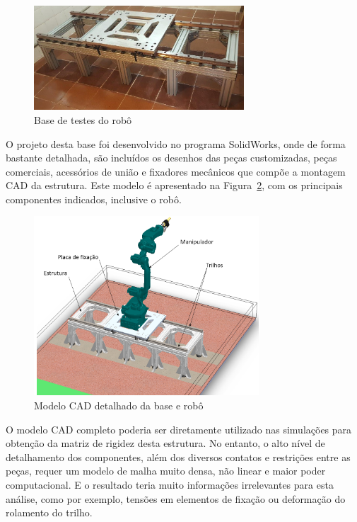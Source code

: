 \begin{figure}[h]
	\centering 
 	\includegraphics[width=0.70\textwidth]{figs/estrut_modelo_fisico}
 	\caption{Base de testes do robô}
 	\label{fig::estrut_modelo_fisico}
\end{figure}

O projeto desta base foi desenvolvido no programa SolidWorks, onde de forma
bastante detalhada, são incluídos os desenhos das peças customizadas, peças
comerciais, acessórios de união e fixadores mecânicos que compõe a montagem CAD
da estrutura. Este modelo é apresentado na Figura~\ref{fig::estrutCAD}, com os
principais componentes indicados, inclusive o robô.

\begin{figure}[h]
	\centering 
 	\includegraphics[width=0.75\textwidth]{figs/estrutCAD}
 	\caption{Modelo CAD detalhado da base e robô}
 	\label{fig::estrutCAD}
\end{figure}

O modelo CAD completo poderia ser diretamente utilizado nas
simulações para obtenção da matriz de rigidez desta estrutura. No entanto, o
alto nível de detalhamento dos componentes, além dos diversos contatos e
restrições entre as peças, requer um modelo de malha muito densa, não linear e
maior poder computacional. E o resultado teria muito informações irrelevantes
para esta análise, como por exemplo, tensões em elementos de fixação ou
deformação do rolamento do trilho.

